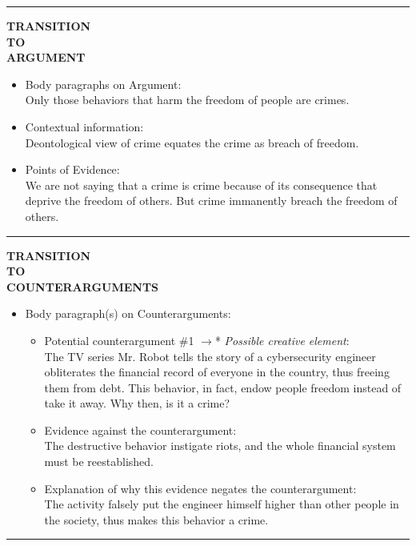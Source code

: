 \documentclass{article}
\begin{document}
\noindent\rule{16cm}{0.4pt}

\begin{paracol}{3}
	\switchcolumn[0]
	\noindent \textbf{TRANSITION}\\
	\noindent \textbf{TO}\\
	\noindent \textbf{ARGUMENT}\\
	\switchcolumn[2]
\begin{itemize}
	\item Body paragraphs on Argument:\\
		Only those behaviors that harm the freedom of people are crimes.
	\item Contextual information:\\
		Deontological view of crime equates the crime as breach of freedom.
	\item Points of Evidence:\\
		We are not saying that a crime is crime because of its consequence that deprive the freedom of others. But crime immanently breach the freedom of others.


\end{itemize}
\end{paracol}
\noindent\rule{16cm}{0.4pt}

\begin{paracol}{3}
	\switchcolumn[0]
	\noindent \textbf{TRANSITION}\\
	\noindent \textbf{TO}\\
	\noindent \textbf{COUNTERARGUMENTS}\\
	\switchcolumn[2]
\begin{itemize}
	\item Body paragraph(s) on Counterarguments:
	\begin{itemize}
		\item Potential counterargument \#1 $\to$* \textit{Possible creative element}:\\
			The TV series Mr. Robot tells the story of a cybersecurity engineer obliterates the financial record of everyone in the country, thus freeing them from debt. This behavior, in fact, endow people freedom instead of take it away. Why then, is it a crime?
		\item Evidence against the counterargument:\\
		The destructive behavior instigate riots, and the whole financial system must be reestablished.
		\item Explanation of why this evidence negates the counterargument:\\
			The activity falsely put the engineer himself higher than other people in the society, thus makes this behavior a crime.
	\end{itemize}
\end{itemize}
\end{paracol}
\noindent\rule{16cm}{0.4pt}
\end{document}

